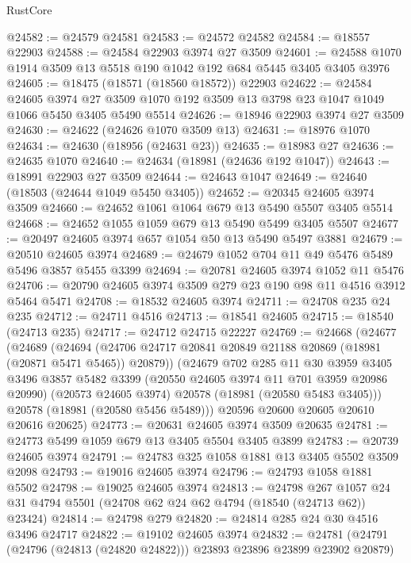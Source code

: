 \begin{lexlean}{RustCore}
\begin{coremodule}
@24582 := @24579 @24581
@24583 := @24572 @24582
@24584 := @18557 @22903
@24588 := @24584 @22903 @3974 @27 @3509
@24601 := @24588 @1070 @1914 @3509 @13 @5518 @190 @1042 @192 @684 @5445 @3405 @3405 @3976
@24605 := @18475 (@18571 (@18560 @18572)) @22903
@24622 := @24584
    @24605
    @3974
    @27
    @3509
    @1070
    @192
    @3509
    @13
    @3798
    @23
    @1047
    @1049
    @1066
    @5450
    @3405
    @5490
    @5514
@24626 := @18946 @22903 @3974 @27 @3509
@24630 := @24622 (@24626 @1070 @3509 @13)
@24631 := @18976 @1070
@24634 := @24630 (@18956 (@24631 @23))
@24635 := @18983 @27
@24636 := @24635 @1070
@24640 := @24634 (@18981 (@24636 @192 @1047))
@24643 := @18991 @22903 @27 @3509
@24644 := @24643 @1047
@24649 := @24640 (@18503 (@24644 @1049 @5450 @3405))
@24652 := @20345 @24605 @3974 @3509
@24660 := @24652 @1061 @1064 @679 @13 @5490 @5507 @3405 @5514
@24668 := @24652 @1055 @1059 @679 @13 @5490 @5499 @3405 @5507
@24677 := @20497 @24605 @3974 @657 @1054 @50 @13 @5490 @5497 @3881
@24679 := @20510 @24605 @3974
@24689 := @24679 @1052 @704 @11 @49 @5476 @5489 @5496 @3857 @5455 @3399
@24694 := @20781 @24605 @3974 @1052 @11 @5476
@24706 := @20790 @24605 @3974 @3509 @279 @23 @190 @98 @11 @4516 @3912 @5464 @5471
@24708 := @18532 @24605 @3974
@24711 := @24708 @235 @24 @235
@24712 := @24711 @4516
@24713 := @18541 @24605
@24715 := @18540 (@24713 @235)
@24717 := @24712 @24715 @22227
@24769 := @24668
    (@24677
      (@24689
        (@24694 (@24706 @24717 @20841 @20849 @21188 @20869 (@18981 (@20871 @5471 @5465)) @20879))
        (@24679
          @702
          @285
          @11
          @30
          @3959
          @3405
          @3496
          @3857
          @5482
          @3399
          (@20550 @24605 @3974 @11 @701 @3959 @20986 @20990)
          (@20573 @24605 @3974)
          @20578
          (@18981 (@20580 @5483 @3405)))
        @20578
        (@18981 (@20580 @5456 @5489)))
      @20596
      @20600
      @20605
      @20610
      @20616
      @20625)
@24773 := @20631 @24605 @3974 @3509 @20635
@24781 := @24773 @5499 @1059 @679 @13 @3405 @5504 @3405 @3899
@24783 := @20739 @24605 @3974
@24791 := @24783 @325 @1058 @1881 @13 @3405 @5502 @3509 @2098
@24793 := @19016 @24605 @3974
@24796 := @24793 @1058 @1881 @5502
@24798 := @19025 @24605 @3974
@24813 := @24798
    @267
    @1057
    @24
    @31
    @4794
    @5501
    (@24708 @62 @24 @62 @4794 (@18540 (@24713 @62)) @23424)
@24814 := @24798 @279
@24820 := @24814 @285 @24 @30 @4516 @3496 @24717
@24822 := @19102 @24605 @3974
@24832 := @24781 (@24791 (@24796 (@24813 (@24820 @24822))) @23893 @23896 @23899 @23902 @20879)

\end{coremodule}
\end{lexlean}
